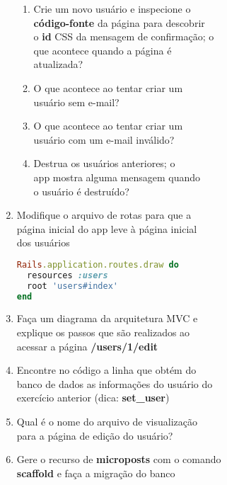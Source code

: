 \documentclass[a4paper,12pt]{article}
\begin{document}
\begin{enumerate}
    \begin{enumerate}
      \item Crie um novo usuário e inspecione o \\
            \textbf{código-fonte} da página para descobrir \\
            o \textbf{id} CSS da mensagem de confirmação; o \\
            que acontece quando a página é \\
            atualizada?
      \item O que acontece ao tentar criar um \\
            usuário sem e-mail?
      \item O que acontece ao tentar criar um \\
            usuário com um e-mail inválido?
      \item Destrua os usuários anteriores; o \\
            app mostra alguma mensagem quando \\
            o usuário é destruído?
    \end{enumerate}

  \item Modifique o arquivo de rotas para que a \\
        página inicial do app leve à página inicial \\
        dos usuários

    \begin{lstlisting}[language=Ruby, title=config/routes.rb]
Rails.application.routes.draw do
  resources :users
  root 'users#index'
end
    \end{lstlisting}

  \item Faça um diagrama da arquitetura MVC e \\
        explique os passos que são realizados ao \\
        acessar a página \textbf{/users/1/edit}
  \item Encontre no código a linha que obtém do \\
        banco de dados as informações do usuário do \\
        exercício anterior (dica: \textbf{set\_user})
  \item Qual é o nome do arquivo de visualização \\
        para a página de edição do usuário?

  \item Gere o recurso de \textbf{microposts} com o comando \\
        \textbf{scaffold} e faça a migração do banco


\end{enumerate}
\end{document}
